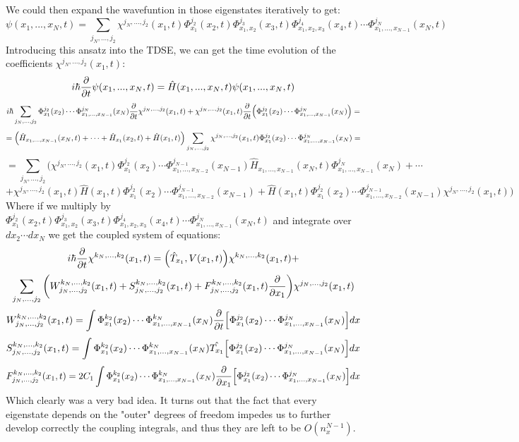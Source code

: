 \documentclass[11pt, a4paper]{article} %
\begin{document}
We could then expand the wavefuntion in those eigenstates iteratively to get:
\begin{equation}
\psi(x_1,...,x_N,t)=\sum_{j_N,...,j_2} \chi^{j_N,...,j_2}(x_1,t) \Phi^{j_2}_{x_1}(x_2,t) \Phi^{j_3}_{x_1,x_2}(x_3,t) \Phi^{j_4}_{x_1, x_2, x_3}(x_4,t)\cdots \Phi^{j_N}_{x_1,... ,x_{N-1}}(x_N, t)
\end{equation}
Introducing this ansatz into the TDSE, we can get the time evolution of the coefficients $\chi^{j_N,...,j_2}(x_1,t)$:
\begin{equation}
i\hbar\pdv{}{t}\psi(x_1,...,x_N,t)= \hat{H}(x_1,...,x_N,t)\psi(x_1,...,x_N,t)
\end{equation}
$$
i\hbar\sum_{j_N,...,j_2}  \Phi^{j_2}_{x_1}(x_2) \cdots \Phi^{j_N}_{x_1,... ,x_{N-1}}(x_N)\pdv{}{t}\chi^{j_N,...,j_2}(x_1,t) + \chi^{j_N,...,j_2}(x_1,t) \pdv{}{t}\qty(\Phi^{j_2}_{x_1}(x_2) \cdots \Phi^{j_N}_{x_1,... ,x_{N-1}}(x_N)) =
$$
$$
 =\qty( \hat{H}_{x_1,...,x_{N-1}}(x_N,t)+\cdots+\hat{H}_{x_1}(x_2,t)+ \hat{H}(x_1,t))\sum_{j_N,...,j_2} \chi^{j_N,...,j_2}(x_1,t) \Phi^{j_2}_{x_1}(x_2)\cdots \Phi^{j_N}_{x_1,... ,x_{N-1}}(x_N)=
$$
$$
 =\sum_{j_N,...,j_2}\Big(  \chi^{j_N,...,j_2}(x_1,t) \Phi^{j_2}_{x_1}(x_2)\cdots \Phi^{j_{N-1}}_{x_1,... ,x_{N-2}}(x_{N-1})\hat{H}_{x_1,...,x_{N-1}}(x_N,t)\Phi^{j_{N}}_{x_1,... ,x_{N-1}}(x_{N})+\cdots
$$
$$
+ \chi^{j_N,...,j_2}(x_1,t)\hat{H}(x_1,t)\Phi^{j_2}_{x_1}(x_2)\cdots \Phi^{j_{N-1}}_{x_1,... ,x_{N-2}}(x_{N-1})+ \hat{H}(x_1,t)\Phi^{j_2}_{x_1}(x_2)\cdots \Phi^{j_{N-1}}_{x_1,... ,x_{N-2}}(x_{N-1})\chi^{j_N,...,j_2}(x_1,t)\Big)
$$
Where if we multiply by $\Phi^{j_2}_{x_1}(x_2,t) \Phi^{j_3}_{x_1,x_2}(x_3,t) \Phi^{j_4}_{x_1, x_2, x_3}(x_4,t)\cdots \Phi^{j_N}_{x_1,... ,x_{N-1}}(x_N, t)$ and integrate over $dx_2\cdots dx_N$ we get the coupled system of equations:
\begin{equation}
i\hbar \pdv{}{t}\chi^{k_N,...,k_2}(x_1,t) = \qty(\hat{T}_{x_1}, V(x_1,t)) \chi^{k_N,...,k_2}(x_1,t)+
\end{equation}
$$
\sum_{j_N,...,j_2} \qty(W^{k_N,...,k_2}_{j_N,...,j_2}(x_1,t)+S^{k_N,...,k_2}_{j_N,...,j_2}(x_1,t)+F^{k_N,...,k_2}_{j_N,...,j_2}(x_1,t)\pdv{}{x_1} ) \chi^{j_N,...,j_2}(x_1,t)
$$
\begin{equation}
W^{k_N,...,k_2}_{j_N,...,j_2}(x_1,t)=\int \Phi^{k_2}_{x_1}(x_2) \cdots \Phi^{k_N}_{x_1,... ,x_{N-1}}(x_N) \pdv{}{t}\qty[\Phi^{j_2}_{x_1}(x_2) \cdots \Phi^{j_N}_{x_1,... ,x_{N-1}}(x_N)]dx
\end{equation}
\begin{equation}
S^{k_N,...,k_2}_{j_N,...,j_2}(x_1,t)=\int \Phi^{k_2}_{x_1}(x_2) \cdots \Phi^{k_N}_{x_1,... ,x_{N-1}}(x_N) \hat{T_{x_1}}\qty[\Phi^{j_2}_{x_1}(x_2) \cdots \Phi^{j_N}_{x_1,... ,x_{N-1}}(x_N)]dx
\end{equation}
\begin{equation}
F^{k_N,...,k_2}_{j_N,...,j_2}(x_1,t)=2C_1\int \Phi^{k_2}_{x_1}(x_2) \cdots \Phi^{k_N}_{x_1,... ,x_{N-1}}(x_N) \pdv{}{x_1}\qty[\Phi^{j_2}_{x_1}(x_2) \cdots \Phi^{j_N}_{x_1,... ,x_{N-1}}(x_N)]dx
\end{equation}
Which clearly was a very bad idea. It turns out that the fact that every eigenstate depends on the "outer" degrees of freedom impedes us to further develop correctly the coupling integrals, and thus they are left to be $O(n_x^{N-1})$.
\end{document}
